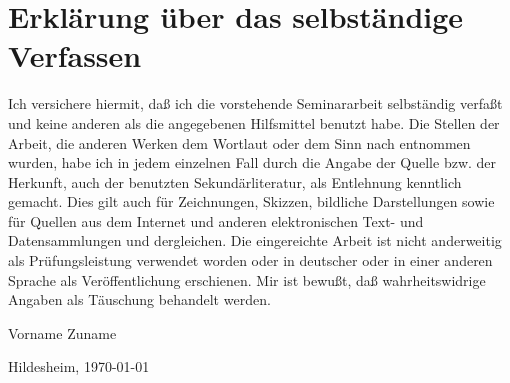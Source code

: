 \documentclass[12pt,        %
  english,ngerman,          %
  paper=a4,                 %
  captions=tablesignature,  %
  listof=numbered,          %
  bibliography=totoc,       %
  headings=small,           %
  headinclude=false,        %
  footinclude=false,        %
  parskip=half-,            %
  oneside,                  %
  DIV=12                    %
  ]{scrartcl}                %
\begin{document}
\newpage
\section*{Erklärung über das selbständige Verfassen}
\thispagestyle{empty}

  {
    Ich versichere hiermit, daß ich die vorstehende Seminararbeit
    selbständig verfaßt und keine anderen als die angegebenen Hilfsmittel
    benutzt habe. Die Stellen der Arbeit, die anderen Werken dem Wortlaut
    oder dem Sinn nach entnommen wurden, habe ich in jedem einzelnen Fall
    durch die Angabe der Quelle bzw. der Herkunft, auch der benutzten
    Sekundärliteratur, als Entlehnung kenntlich gemacht. Dies gilt auch für
    Zeichnungen, Skizzen, bildliche Darstellungen sowie für Quellen aus dem 
    Internet und anderen elektronischen Text- und Datensammlungen und
    dergleichen. Die eingereichte Arbeit ist nicht anderweitig als
    Prüfungsleistung verwendet worden oder in deutscher oder in einer anderen 
    Sprache als Veröffentlichung erschienen. Mir ist bewußt, daß
    wahrheitswidrige Angaben als Täuschung behandelt werden.
  }


\vspace*{4cm}

Vorname Zuname

\vspace*{1cm}

Hildesheim, \today
\end{document}
